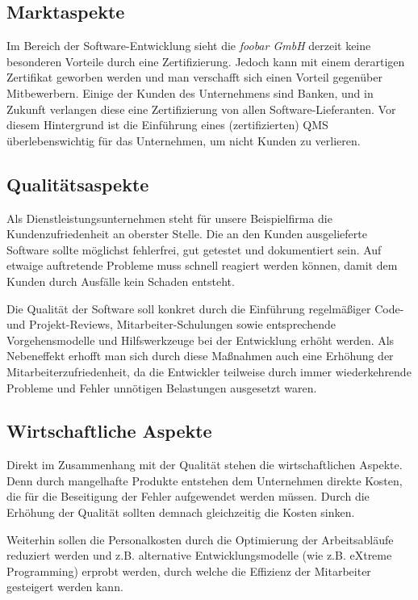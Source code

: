 \subsection{Marktaspekte}
Im Bereich der Software-Entwicklung sieht die \emph{foobar GmbH} derzeit keine
besonderen Vorteile durch eine Zertifizierung. Jedoch kann mit einem derartigen
Zertifikat geworben werden und man verschafft sich einen Vorteil gegenüber
Mitbewerbern. Einige der Kunden des Unternehmens sind Banken, und in Zukunft
verlangen diese eine Zertifizierung von allen Software-Lieferanten. Vor diesem
Hintergrund ist die Einführung eines (zertifizierten) QMS überlebenswichtig für
das Unternehmen, um nicht Kunden zu verlieren.

\subsection{Qualitätsaspekte}
Als Dienstleistungsunternehmen steht für unsere Beispielfirma die
Kundenzufriedenheit an oberster Stelle. Die an den Kunden ausgelieferte Software
sollte möglichst fehlerfrei, gut getestet und dokumentiert sein. Auf etwaige
auftretende Probleme muss schnell reagiert werden können, damit dem Kunden durch
Ausfälle kein Schaden entsteht.

Die Qualität der Software soll konkret durch die Einführung regelmäßiger Code-
und Projekt-Reviews, Mitarbeiter-Schulungen sowie entsprechende Vorgehensmodelle
und Hilfswerkzeuge bei der Entwicklung erhöht werden. Als Nebeneffekt erhofft
man sich durch diese Maßnahmen auch eine Erhöhung der Mitarbeiterzufriedenheit,
da die Entwickler teilweise durch immer wiederkehrende Probleme und Fehler
unnötigen Belastungen ausgesetzt waren.

\subsection{Wirtschaftliche Aspekte}
Direkt im Zusammenhang mit der Qualität stehen die wirtschaftlichen Aspekte.
Denn durch mangelhafte Produkte entstehen dem Unternehmen direkte Kosten, die
für die Beseitigung der Fehler aufgewendet werden müssen. Durch die Erhöhung der
Qualität sollten demnach gleichzeitig die Kosten sinken. 

Weiterhin sollen die Personalkosten durch die Optimierung der Arbeitsabläufe
reduziert werden und z.B. alternative Entwicklungsmodelle (wie z.B. eXtreme
Programming) erprobt werden, durch welche die Effizienz der Mitarbeiter
gesteigert werden kann.

